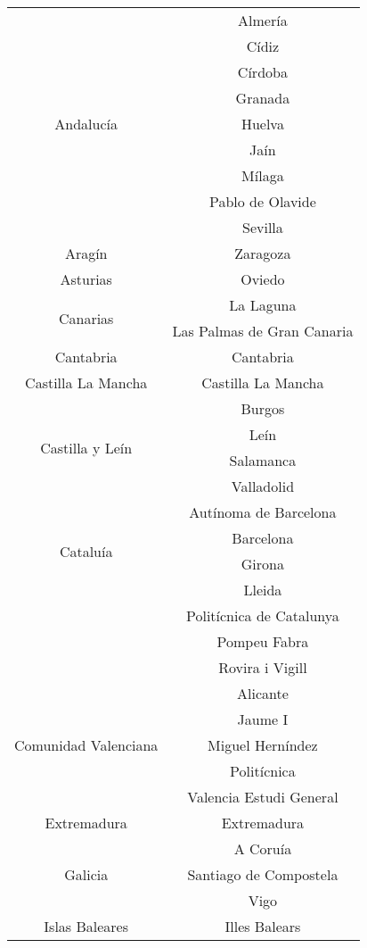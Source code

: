 \begin{longtable}{|c|c|}
    \multirow{9}{2cm}{Andalucía} & Almería \\
        & Cídiz \\
        & Círdoba \\
        & Granada \\
        & Huelva \\
        & Jaín \\
        & Mílaga \\
        & Pablo de Olavide \\
        & Sevilla \\\hline
    Aragín & Zaragoza \\\hline
    Asturias & Oviedo \\\hline
    \multirow{2}{2cm}{Canarias} & La Laguna \\
        & Las Palmas de Gran Canaria \\\hline
    Cantabria & Cantabria \\\hline
    Castilla La Mancha & Castilla La Mancha \\\hline
    \multirow{4}{2cm}{Castilla y Leín} & Burgos \\
        & Leín \\
        & Salamanca \\
        & Valladolid \\\hline
    \multirow{4}{2cm}{Cataluía} & Autínoma de Barcelona \\
        & Barcelona \\
        & Girona \\
        & Lleida \\
        & Politícnica de Catalunya \\
        & Pompeu Fabra \\
        & Rovira i Vigill \\\hline
    \multirow{5}{2cm}{Comunidad Valenciana} & Alicante \\
        & Jaume I \\
        & Miguel Herníndez \\
        & Politícnica \\
        & Valencia Estudi General\\\hline
    Extremadura & Extremadura \\\hline
    \multirow{3}{2cm}{Galicia} & A Coruía \\
        & Santiago de Compostela \\
        & Vigo \\\hline
    Islas Baleares & Illes Balears \\\hline

\end{longtable}
